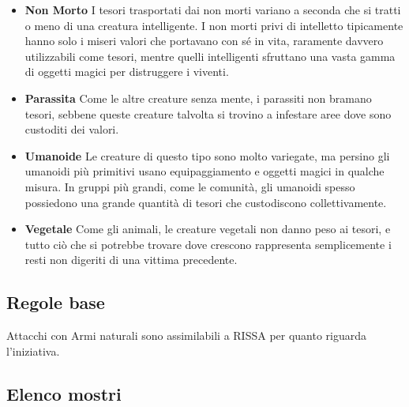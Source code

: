\documentclass[12pt,a4paper,twoside,openany]{book}
\begin{document}
\begin{multicols}{2}
\begin{itemize}
\item \textbf{Non Morto}
I tesori trasportati dai non morti variano a seconda che si tratti o meno di una creatura intelligente. I non morti privi di intelletto tipicamente hanno solo i miseri valori che portavano con sé in vita, raramente davvero utilizzabili come tesori, mentre quelli intelligenti sfruttano una vasta gamma di oggetti magici per distruggere i viventi.

\item \textbf{Parassita}
Come le altre creature senza mente, i parassiti non bramano tesori, sebbene queste creature talvolta si trovino a infestare aree dove sono custoditi dei valori.

\item \textbf{Umanoide}
Le creature di questo tipo sono molto variegate, ma persino gli umanoidi più primitivi usano equipaggiamento e oggetti magici in qualche misura. In gruppi più grandi, come le comunità, gli umanoidi spesso possiedono una grande quantità di tesori che custodiscono collettivamente.

\item \textbf{Vegetale}
Come gli animali, le creature vegetali non danno peso ai tesori, e tutto ciò che si potrebbe trovare dove crescono rappresenta semplicemente i resti non digeriti di una vittima precedente.

\end{itemize}




\subsection{Regole base}

Attacchi con Armi naturali sono assimilabili a RISSA per quanto riguarda l'iniziativa.

\end{multicols}

\pagebreak

\subsection{Elenco mostri}
\end{document}
